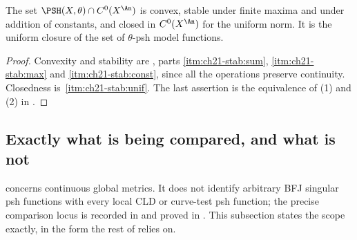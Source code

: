 \begin{corollary}
\label{cor:ch21-continuous-cone}
The set \(\PSH(X,\theta)\cap C^0(X^{\An})\) is convex, stable under finite
maxima and under addition of constants, and closed in \(C^0(X^{\An})\) for
the uniform norm.  It is the uniform closure of the set of \(\theta\)-psh
model functions.
\end{corollary}

\begin{proof}
Convexity and stability are
, parts \cref{itm:ch21-stab:sum},
\cref{itm:ch21-stab:max} and \cref{itm:ch21-stab:const}, since all the
operations preserve continuity.  Closedness is
\,\cref{itm:ch21-stab:unif}.  The last assertion is
the equivalence of (1) and (2) in .
\end{proof}

\subsection{Exactly what is being compared, and what is not}
\label{sec:ch21-cld-contrast}

 concerns continuous global metrics.  It
does not identify
arbitrary BFJ singular psh functions with every local CLD or curve-test psh
function; the precise comparison locus is recorded in
 and proved in
.  This subsection states the scope
exactly, in the form the rest of  relies on.


